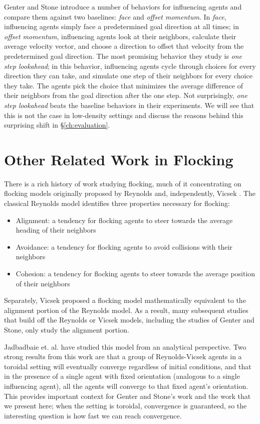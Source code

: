 Genter and Stone introduce a number of behaviors for influencing agents and
compare them against two baselines: \textit{face} and \textit{offset momentum}.
In \textit{face}, influencing agents simply face a predetermined goal direction
at all times; in \textit{offset momentum}, influencing agents look at their
neighbors, calculate their average velocity vector, and choose a direction to
offset that velocity from the predetermined goal direction.
The most promising behavior they study is \textit{one step lookahead}; in this
behavior, influencing agents cycle through choices for every direction they
can take, and simulate one step of their neighbors for every choice they take.
The agents pick the choice that minimizes the average difference of their
neighbors from the goal direction after the one step.
Not surprisingly, \textit{one step lookahead} beats the baseline behaviors in
their experiments.
We will see that this is not the case in low-density settings and discuss the
reasons behind this surprising shift in \S\ref{ch:evaluation}.

\section{Other Related Work in Flocking}
There is a rich history of work studying flocking, much of it concentrating on
flocking models originally proposed by Reynolds \cite{reynoldsmodel} and,
independently, Vicsek \cite{vicsek1995}.
The classical Reynolds model identifies three properties necessary for
flocking:
\begin{itemize}
    \item Alignment: a tendency for flocking agents to steer towards the
            average heading of their neighbors
    \item Avoidance: a tendency for flocking agents to avoid collisions with
            their neighbors
    \item Cohesion: a tendency for flocking agents to steer towards the average
            position of their neighbors
\end{itemize}
\noindent Separately, Vicsek proposed a flocking model mathematically
equivalent to the alignment portion of the Reynolds model.
As a result, many subsequent studies that build off the Reynolds or Vicsek
models, including the studies of Genter and Stone, only study the alignment
portion.

Jadbadbaie et. al. \cite{jad2003convergence} have studied this model from an
analytical perspective.
Two strong results from this work are that a group of Reynolds-Vicsek agents
in a toroidal setting will eventually converge regardless of initial
conditions, and that in the presence of a single agent with fixed orientation
(analogous to a single influencing agent), all the agents will converge to that
fixed agent's orientation.
This provides important context for Genter and Stone's work and the work that
we present here; when the setting is toroidal, convergence is guaranteed, so
the interesting question is how fast we can reach convergence.

